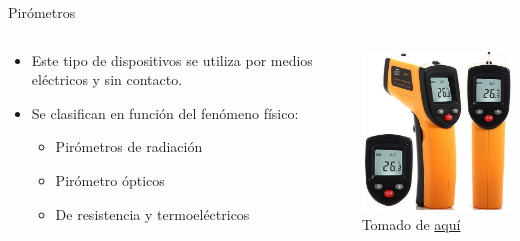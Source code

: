\documentclass[aspectratio=169]{beamer}
\begin{document}
\begin{frame}{Pirómetros}
    \begin{columns}[c, onlytextwidth]
        \begin{column}{0.55\textwidth}
            \begin{itemize}
                \item Este tipo de dispositivos se utiliza por medios eléctricos y sin contacto.
                \item Se clasifican en función del fenómeno físico: 
                \begin{itemize}
                    \item Pirómetros de radiación
                    \item Pirómetro ópticos
                    \item De resistencia y termoeléctricos
                \end{itemize}
            \end{itemize}
        \end{column}
        \begin{column}{0.40\textwidth}
            \includegraphics[width=5.5cm]{fig/Pirometro.jpg}
            \\ \tiny{Tomado de \href{https://como-funciona.co/un-pirometro/}{aquí}}
        \end{column}
    \end{columns}
\end{frame}
\end{document}
